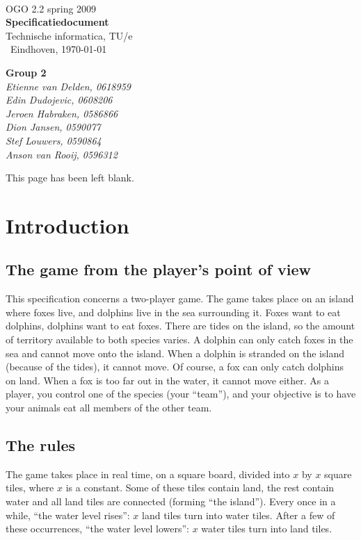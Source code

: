\documentclass[a4paper,twoside,11pt]{book}
\begin{document}
   \begin{titlepage}
        {\ }\\[5.0cm]
        { {\Large OGO 2.2 spring 2009}}\\[0.2cm]
        {\bf \Huge Specificatiedocument}\\[0.1cm]
        { {\Large {Technische informatica, TU/e} }}\\[1.0cm]
        {\ Eindhoven, \today }\\[0.2cm]
        \begin{flushright}
            {\bf {\small Group 2 }}\\[0.0cm]
            {\em {\small Etienne van Delden, 0618959}}\\
            {\em {\small Edin Dudojevic, 0608206}}\\
            {\em {\small Jeroen Habraken, 0586866}}\\
            {\em {\small Dion Jansen, 0590077 }}\\
            {\em {\small Stef Louwers, 0590864}}\\
            {\em {\small Anson van Rooij, 0596312}}\\[0.5cm]
        \end{flushright}
    \end{titlepage}
\newpage This page has been left blank.
    \tableofcontents

\chapter{Introduction}
\section{The game from the player's point of view}
This specification concerns a two-player game. The game takes place on an island where foxes live, and dolphins live in the sea surrounding it. Foxes want to eat dolphins, dolphins want to eat foxes. There are tides on the island, so the amount of territory available to both species varies. A dolphin can only catch foxes in the sea and cannot move onto the island. When a dolphin is stranded on the island (because of the tides), it cannot move. Of course, a fox can only catch dolphins on land. When a fox is too far out in the water, it cannot move either. As a player, you control one of the species (your ``team''), and your objective is to have your animals eat all members of the other team.

\section{The rules}
The game takes place in real time, on a square board, divided into $x$ by $x$ square tiles, where $x$ is a constant. Some of these tiles contain land, the rest contain water and all land tiles are connected (forming ``the island''). Every once in a while, ``the water level rises'': $x$ land tiles turn into water tiles. After a few of these occurrences, ``the water level lowers'': $x$ water tiles turn into land tiles.
\end{document}
